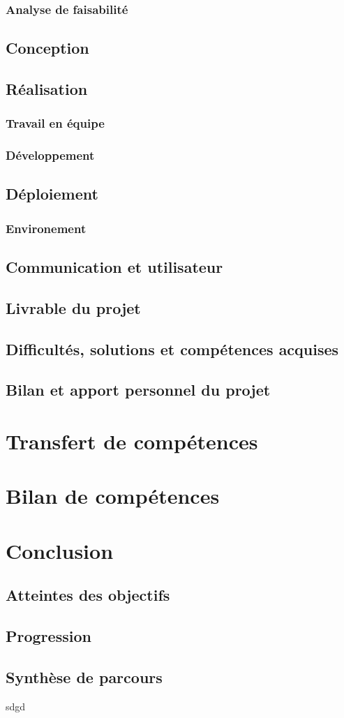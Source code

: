 \documentclass[12pt,a4paper]{report}
\begin{document}
\subsubsection{Analyse de faisabilité}
\subsection{Conception}
\subsection{Réalisation}
\subsubsection{Travail en équipe}
\subsubsection{Développement}
\subsection{Déploiement}
\subsubsection{Environement}
\subsection{Communication et utilisateur}
\subsection{Livrable du projet}
\subsection{Difficultés, solutions et compétences acquises}
\subsection{Bilan et apport personnel du projet}

\section{Transfert de compétences}

\section{Bilan de compétences}

\section{Conclusion}
\subsection{Atteintes des objectifs}
\subsection{Progression}
\subsection{Synthèse de parcours}
sdgd
\end{document}
